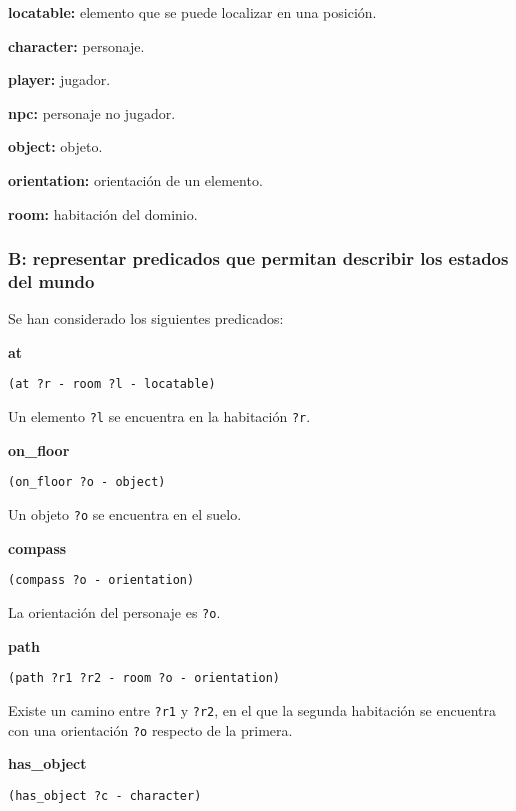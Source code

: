 \documentclass[11pt,a4paper]{article}
\begin{document}
\textbf{locatable:} elemento que se puede localizar en una posición.
	
\quad \textbf{character:} personaje.

\quad \quad	\textbf{player:} jugador.

\quad \quad \textbf{npc:} personaje no jugador.

\quad \textbf{object:} objeto.

\textbf{orientation:} orientación de un elemento.

\textbf{room:} habitación del dominio.

\subsubsection*{B: representar predicados que permitan describir los estados del mundo}

Se han considerado los siguientes predicados:

\medskip

\large{\textbf{at}}

\texttt{(at ?r - room ?l - locatable)}

\smallskip

Un elemento \texttt{?l} se encuentra en la habitación \texttt{?r}. 

\medskip

\large{\textbf{on\_floor}}

\texttt{(on\_floor ?o - object)}

\smallskip

Un objeto \texttt{?o} se encuentra en el suelo. 

\medskip

\large{\textbf{compass}}

\texttt{(compass ?o - orientation)}

\smallskip

La orientación del personaje es \texttt{?o}.

\medskip

\large{\textbf{path}}

\texttt{(path ?r1 ?r2 - room ?o - orientation)}

\smallskip

Existe un camino entre \texttt{?r1} y \texttt{?r2}, en el que la segunda habitación
se encuentra con una orientación \texttt{?o} respecto de la primera.

\medskip

\large{\textbf{has\_object}}

\texttt{(has\_object ?c - character)}
\end{document}
